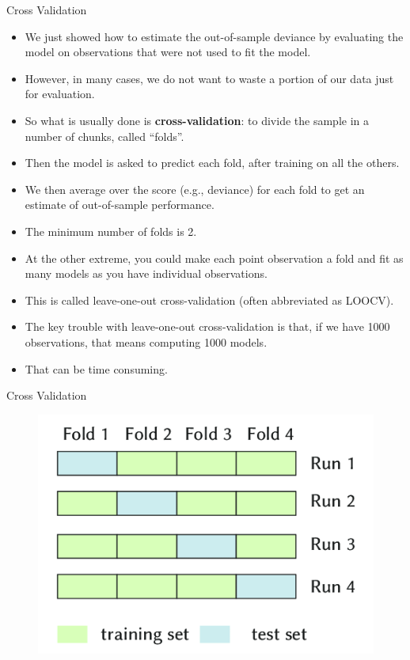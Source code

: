 \documentclass[handout]{beamer}
\begin{document}
\begin{frame}{Cross Validation}
\scriptsize{

\begin{itemize}
\item We just showed how to estimate the out-of-sample deviance by  evaluating the model on observations that were not used to fit the model.

\item However, in many cases, we do not want to waste a portion of our data just for evaluation.

\item So what is usually done is \textbf{cross-validation}: to divide the sample in a number of chunks, called ``folds''.
\item Then the model is asked to predict each fold, after training on all the others.
\item We then average over the score (e.g., deviance) for each fold to get an estimate of out-of-sample performance.
\item The minimum number of folds is 2.
\item At the other extreme, you could make each point observation a fold and fit as many models as you have individual observations.
\item This is called leave-one-out cross-validation (often abbreviated as LOOCV).
\item The key trouble with leave-one-out cross-validation is that, if we have 1000 observations, that means computing 1000 models.
\item That can be time consuming.
\end{itemize}


}
\end{frame}


\begin{frame}{Cross Validation}
\scriptsize{

\begin{figure}[h!]
	\centering
	\includegraphics[scale=0.4]{pics/crossvalidation.png}
\end{figure}

}
\end{frame}
\end{document}
